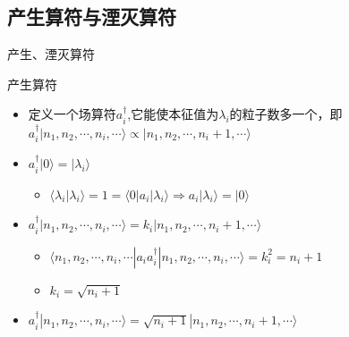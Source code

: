 \documentclass{beamer}
\begin{document}
\subsection{产生算符与湮灭算符}
\begin{frame}{产生、湮灭算符}
	\begin{block}{产生算符}
		\begin{itemize}
			\item 定义一个场算符$a_{i}^{\dagger}$,它能使本征值为$\lambda_{i}$的粒子数多一个，即$a_{i}^{\dagger}|n_{1},n_{2},\cdots,n_{i},\cdots\rangle\propto |n_{1},n_{2},\cdots,n_{i}+1,\cdots\rangle$
			\item $a_{i}^{\dagger}|0\rangle=|\lambda_{i}\rangle$
			\begin{itemize}
				\item $\langle \lambda_{i}|\lambda_{i}\rangle=1=\langle 0|a_{i}|\lambda_{i}\rangle\Rightarrow a_{i}|\lambda_{i}\rangle=|0\rangle$
			\end{itemize}
			\item $a_{i}^{\dagger}|n_{1},n_{2},\cdots,n_{i},\cdots\rangle=k_{i} |n_{1},n_{2},\cdots,n_{i}+1,\cdots\rangle$
			\begin{itemize}
				\item $\langle n_{1},n_{2},\cdots,n_{i},\cdots|a_{i}a_{i}^{\dagger}|n_{1},n_{2},\cdots,n_{i},\cdots\rangle=k_{i}^{2}=n_{i}+1$
				\item $k_{i}=\sqrt{n_{i}+1}$
			\end{itemize}
			\item $a_{i}^{\dagger}|n_{1},n_{2},\cdots,n_{i},\cdots\rangle=\sqrt{n_{i}+1} |n_{1},n_{2},\cdots,n_{i}+1,\cdots\rangle$
		\end{itemize}
	\end{block}
\end{frame}
\end{document}
